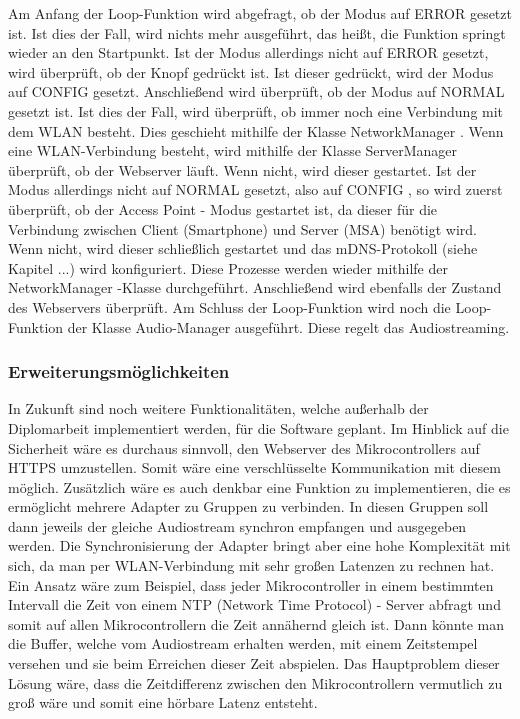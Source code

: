 \documentclass[11pt, twoside]{article}
\begin{document}
Am Anfang der Loop-Funktion wird abgefragt, ob der Modus auf \glqq ERROR \grqq{} gesetzt ist. Ist dies der Fall, wird nichts mehr ausgeführt, das heißt, die Funktion springt wieder an den Startpunkt. Ist der Modus allerdings nicht auf \glqq ERROR \grqq{} gesetzt, wird überprüft, ob der Knopf gedrückt ist. Ist dieser gedrückt, wird der Modus auf \glqq CONFIG \grqq{} gesetzt. Anschließend wird überprüft, ob der Modus auf \glqq NORMAL \grqq{} gesetzt ist. Ist dies der Fall, wird überprüft, ob immer noch eine Verbindung mit dem WLAN besteht. Dies geschieht mithilfe der Klasse \glqq NetworkManager \grqq{}. Wenn eine WLAN-Verbindung besteht, wird mithilfe der Klasse \glqq ServerManager \grqq{} überprüft, ob der Webserver läuft. Wenn nicht, wird dieser gestartet. Ist der Modus allerdings nicht auf \glqq NORMAL \grqq{} gesetzt, also auf \glqq CONFIG \grqq{}, so wird zuerst überprüft, ob der Access Point - Modus gestartet ist, da dieser für die Verbindung zwischen Client (Smartphone) und Server (MSA) benötigt wird. Wenn nicht, wird dieser schließlich gestartet und das mDNS-Protokoll (siehe Kapitel ...) wird konfiguriert. Diese Prozesse werden wieder mithilfe der \glqq NetworkManager \grqq{} -Klasse durchgeführt. Anschließend wird ebenfalls der Zustand des Webservers überprüft. Am Schluss der Loop-Funktion wird noch die Loop-Funktion der Klasse Audio-Manager ausgeführt. Diese regelt das Audiostreaming.
\subsubsection{Erweiterungsmöglichkeiten}
In Zukunft sind noch weitere Funktionalitäten, welche außerhalb der Diplomarbeit implementiert werden, für die Software geplant. Im Hinblick auf die Sicherheit wäre es durchaus sinnvoll, den Webserver des Mikrocontrollers auf HTTPS umzustellen. Somit wäre eine verschlüsselte Kommunikation mit diesem möglich. Zusätzlich wäre es auch denkbar eine Funktion zu implementieren, die es ermöglicht mehrere Adapter zu Gruppen zu verbinden. In diesen Gruppen soll dann jeweils der gleiche Audiostream synchron empfangen und ausgegeben werden. Die Synchronisierung der Adapter bringt aber eine hohe Komplexität mit sich, da man per WLAN-Verbindung mit sehr großen Latenzen zu rechnen hat. Ein Ansatz wäre zum Beispiel, dass jeder Mikrocontroller in einem bestimmten Intervall die Zeit von einem NTP (Network Time Protocol) - Server abfragt und somit auf allen Mikrocontrollern die Zeit annähernd gleich ist. Dann könnte man die Buffer, welche vom Audiostream erhalten werden, mit einem Zeitstempel versehen und sie beim Erreichen dieser Zeit abspielen. Das Hauptproblem dieser Lösung wäre, dass die Zeitdifferenz zwischen den Mikrocontrollern vermutlich zu groß wäre und somit eine hörbare Latenz entsteht.
\end{document}
